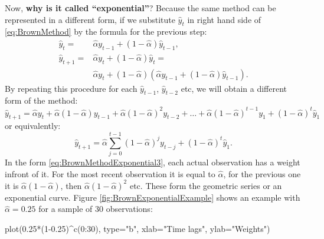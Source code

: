 \documentclass[
]{book}
\newenvironment{Shaded}{\begin{snugshade}}{\end{snugshade}}
\newcommand{\AttributeTok}[1]{\textcolor[rgb]{0.77,0.63,0.00}{#1}}
\newcommand{\DecValTok}[1]{\textcolor[rgb]{0.00,0.00,0.81}{#1}}
\newcommand{\FloatTok}[1]{\textcolor[rgb]{0.00,0.00,0.81}{#1}}
\newcommand{\FunctionTok}[1]{\textcolor[rgb]{0.00,0.00,0.00}{#1}}
\newcommand{\NormalTok}[1]{#1}
\newcommand{\SpecialCharTok}[1]{\textcolor[rgb]{0.00,0.00,0.00}{#1}}
\newcommand{\StringTok}[1]{\textcolor[rgb]{0.31,0.60,0.02}{#1}}
\theoremstyle{definition}
\theoremstyle{definition}
\theoremstyle{definition}
\theoremstyle{definition}
\theoremstyle{remark}
\begin{document}
Now, \textbf{why is it called ``exponential''}? Because the same method can be represented in a different form, if we substitute \(\hat{y}_{t}\) in right hand side of \eqref{eq:BrownMethod} by the formula for the previous step:
\begin{equation}
  \begin{aligned}
  \hat{y}_{t} = &\hat{\alpha} {y}_{t-1} + (1 -\hat{\alpha}) \hat{y}_{t-1}, \\
  \hat{y}_{t+1} = &\hat{\alpha} {y}_{t} + (1 -\hat{\alpha}) \hat{y}_{t} = \\
  & \hat{\alpha} {y}_{t} + (1 -\hat{\alpha}) \left( \hat{\alpha} {y}_{t-1} + (1 -\hat{\alpha}) \hat{y}_{t-1} \right).
  \end{aligned}
  \label{eq:BrownMethodExponential1}
\end{equation}
By repeating this procedure for each \(\hat{y}_{t-1}\), \(\hat{y}_{t-2}\) etc, we will obtain a different form of the method:
\begin{equation}
  \hat{y}_{t+1} = \hat{\alpha} {y}_{t} + \hat{\alpha} (1 -\hat{\alpha}) {y}_{t-1} + \hat{\alpha} (1 -\hat{\alpha})^2 {y}_{t-2} + \dots  + \hat{\alpha} (1 -\hat{\alpha})^{t-1} {y}_{1} + (1 -\hat{\alpha})^t \hat{y}_1 
  \label{eq:BrownMethodExponential2}
\end{equation}
or equivalently:
\begin{equation}
  \hat{y}_{t+1} = \hat{\alpha} \sum_{j=0}^{t-1} (1 -\hat{\alpha})^j {y}_{t-j} + (1 -\hat{\alpha})^t \hat{y}_1 .
  \label{eq:BrownMethodExponential3}
\end{equation}
In the form \eqref{eq:BrownMethodExponential3}, each actual observation has a weight infront of it. For the most recent observation it is equal to \(\hat{\alpha}\), for the previous one it is \(\hat{\alpha} (1 -\hat{\alpha})\), then \(\hat{\alpha} (1 -\hat{\alpha})^2\) etc. These form the geometric series or an exponential curve. Figure \ref{fig:BrownExponentialExample} shows an example with \(\hat{\alpha} =0.25\) for a sample of 30 observations:

\begin{Shaded}
\begin{Highlighting}[]
\FunctionTok{plot}\NormalTok{(}\FloatTok{0.25}\SpecialCharTok{*}\NormalTok{(}\DecValTok{1}\FloatTok{{-}0.25}\NormalTok{)}\SpecialCharTok{\^{}}\FunctionTok{c}\NormalTok{(}\DecValTok{0}\SpecialCharTok{:}\DecValTok{30}\NormalTok{), }\AttributeTok{type=}\StringTok{"b"}\NormalTok{, }
     \AttributeTok{xlab=}\StringTok{"Time lags"}\NormalTok{, }\AttributeTok{ylab=}\StringTok{"Weights"}\NormalTok{)}
\end{Highlighting}
\end{Shaded}
\end{document}
